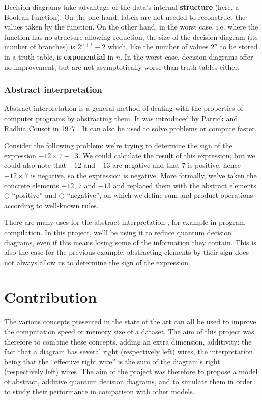 Decision diagrams take advantage of the data's internal \textbf{structure} (here, a Boolean function). On the one hand, labels are not needed to reconstruct the values taken by the function.
On the other hand, in the worst case, i.e. where the function has no structure allowing reduction, the size of the decision diagram (its number of branches) is $2^{n+1} - 2$ which, like the number of values $2^n$ to be stored in a truth table, is \textbf{exponential} in $n$. In the worst case, decision diagrams offer no improvement, but are not asymptotically worse than truth tables either.

\subsubsection*{Abstract interpretation}

Abstract interpretation is a general method of dealing with the properties of computer programs by abstracting them. It was introduced by Patrick and Radhia Cousot in 1977 \cite{CousotCousot77-1}. It can also be used to solve problems or compute faster.

Consider the following problem: we're trying to determine the sign of the expression $-12 \times 7 - 13$. We could calculate the result of this expression, but we could also note that $-12$ and $-13$ are negative and that 7 is positive, hence $-12 \times 7$ is negative, so the expression is negative. More formally, we've taken the concrete elements $-12$, 7 and $-13$ and replaced them with the abstract elements $\oplus$ “positive” and $\ominus$ “negative”, on which we define sum and product operations according to well-known rules.

There are many uses for the abstract interpretation \cite{Rosendahl_1995}, for example in program compilation. In this project, we'll be using it to reduce quantum decision diagrams, even if this means losing some of the information they contain. This is also the case for the previous example: abstracting elements by their sign does not always allow us to determine the sign of the expression.


\section{Contribution}
\label{sec:Contribution}

The various concepts presented in the state of the art can all be used to improve the computation speed or memory size of a dataset. The aim of this project was therefore to combine these concepts, adding an extra dimension, additivity: the fact that a diagram has several right (respectively left) wires, the interpretation being that the “effective right wire” is the sum of the diagram's right (respectively left) wires.
The aim of the project was therefore to propose a model of abstract, additive quantum decision diagrams, and to simulate them in order to study their performance in comparison with other models.

